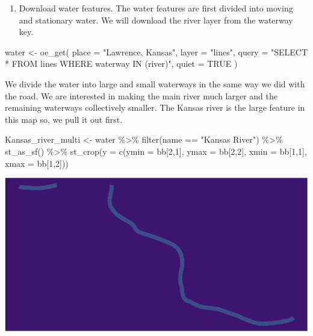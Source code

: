 \documentclass[
  paper=a4,
  ,captions=tableheading
]{scrartcl}
\newenvironment{Shaded}{\begin{snugshade}}{\end{snugshade}}
\newcommand{\AttributeTok}[1]{\textcolor[rgb]{0.77,0.63,0.00}{#1}}
\newcommand{\ConstantTok}[1]{\textcolor[rgb]{0.00,0.00,0.00}{#1}}
\newcommand{\DecValTok}[1]{\textcolor[rgb]{0.00,0.00,0.81}{#1}}
\newcommand{\FunctionTok}[1]{\textcolor[rgb]{0.00,0.00,0.00}{#1}}
\newcommand{\NormalTok}[1]{#1}
\newcommand{\OtherTok}[1]{\textcolor[rgb]{0.56,0.35,0.01}{#1}}
\newcommand{\SpecialCharTok}[1]{\textcolor[rgb]{0.00,0.00,0.00}{#1}}
\newcommand{\StringTok}[1]{\textcolor[rgb]{0.31,0.60,0.02}{#1}}
\providecommand{\tightlist}{%
  \setlength{\itemsep}{0pt}\setlength{\parskip}{0pt}}
\begin{document}
\begin{enumerate}
\def\labelenumi{\arabic{enumi}.}
\setcounter{enumi}{2}
\tightlist
\item
  Download water features. The water features are first divided into
  moving and stationary water. We will download the river layer from the
  waterway key.
\end{enumerate}

\begin{Shaded}
\begin{Highlighting}[]
\NormalTok{water }\OtherTok{\textless{}{-}} \FunctionTok{oe\_get}\NormalTok{(}
  \AttributeTok{place =} \StringTok{"Lawrence, Kansas"}\NormalTok{, }
  \AttributeTok{layer =} \StringTok{"lines"}\NormalTok{,}
  \AttributeTok{query =} \StringTok{"SELECT * FROM lines WHERE waterway IN (\textquotesingle{}river\textquotesingle{})"}\NormalTok{,}
  \AttributeTok{quiet =} \ConstantTok{TRUE}
\NormalTok{)}
\end{Highlighting}
\end{Shaded}

We divide the water into large and small waterways in the same way we
did with the road. We are interested in making the main river much
larger and the remaining waterways collectively smaller. The Kansas
river is the large feature in this map so, we pull it out first.

\begin{Shaded}
\begin{Highlighting}[]
\NormalTok{Kansas\_river\_multi }\OtherTok{\textless{}{-}}\NormalTok{ water }\SpecialCharTok{\%\textgreater{}\%}
  \FunctionTok{filter}\NormalTok{(name }\SpecialCharTok{==} \StringTok{"Kansas River"}\NormalTok{)  }\SpecialCharTok{\%\textgreater{}\%} 
  \FunctionTok{st\_as\_sf}\NormalTok{() }\SpecialCharTok{\%\textgreater{}\%}
  \FunctionTok{st\_crop}\NormalTok{(}\AttributeTok{y =} \FunctionTok{c}\NormalTok{(}\AttributeTok{ymin =}\NormalTok{ bb[}\DecValTok{2}\NormalTok{,}\DecValTok{1}\NormalTok{], }\AttributeTok{ymax =}\NormalTok{ bb[}\DecValTok{2}\NormalTok{,}\DecValTok{2}\NormalTok{], }\AttributeTok{xmin =}\NormalTok{ bb[}\DecValTok{1}\NormalTok{,}\DecValTok{1}\NormalTok{], }\AttributeTok{xmax =}\NormalTok{ bb[}\DecValTok{1}\NormalTok{,}\DecValTok{2}\NormalTok{]))}
\end{Highlighting}
\end{Shaded}

\includegraphics{Haskell_files/figure-latex/unnamed-chunk-24-1.pdf}
\end{document}
